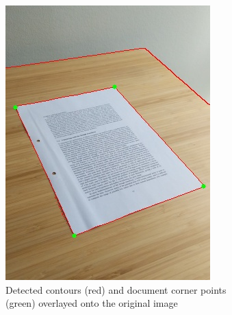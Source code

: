 \documentclass[bibliography=totoc]{scrartcl}
\begin{document}
\begin{figure}[ht!]
	\centering
	\begin{subfigure}[t]{0.315\linewidth}
		\includegraphics[width=\linewidth]{imgs/contours/extreme_angle.jpg}
		\caption{Detected contours (red) and document corner points (green) overlayed onto the original image}
		\label{subfig:contours}
	\end{subfigure}
	\hspace{0.1\textwidth}
	\begin{subfigure}[t]{0.3\linewidth}

\end{subfigure}
\end{figure}
\end{document}
